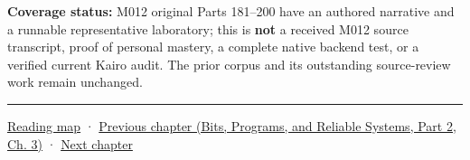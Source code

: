 \textbf{Coverage status:} M012 original Parts 181--200 have an authored narrative and a runnable representative laboratory; this is \textbf{not} a received M012 source transcript, proof of personal mastery, a complete native backend test, or a verified current Kairo audit. The prior corpus and its outstanding source-review work remain unchanged.

\begin{center}\rule{0.5\linewidth}{0.5pt}\end{center}

\hyperref[volume-reading-map]{Reading map} · \href{../01-Bits-Programs-and-Reliable-Systems-P02/main.pdf\#nameddest=01-foundations-i-ch003-records-as-resource-transactions}{Previous chapter (Bits, Programs, and Reliable Systems, Part 2, Ch. 3)} · \hyperref[01-foundations-i-ch005-generic-asset-pipelines-without-hidden-contracts]{Next chapter}
